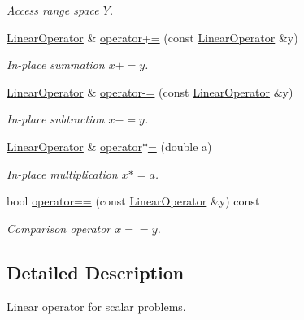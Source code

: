 \begin{DoxyCompactItemize}
\begin{DoxyCompactList}\small\item\em Access range space $Y$. \end{DoxyCompactList}\item 
\hyperlink{structSpacy_1_1Scalar_1_1LinearOperator}{Linear\-Operator} \& \hyperlink{classSpacy_1_1AddArithmeticOperators_afad1d01e1e8c6f75290ac46d9b047ea8}{operator+=} (const \hyperlink{structSpacy_1_1Scalar_1_1LinearOperator}{Linear\-Operator} \&y)
\begin{DoxyCompactList}\small\item\em In-\/place summation $ x+=y$. \end{DoxyCompactList}\item 
\hyperlink{structSpacy_1_1Scalar_1_1LinearOperator}{Linear\-Operator} \& \hyperlink{classSpacy_1_1AddArithmeticOperators_a9fa91e177d13203cfe8cfa991c64ca36}{operator-\/=} (const \hyperlink{structSpacy_1_1Scalar_1_1LinearOperator}{Linear\-Operator} \&y)
\begin{DoxyCompactList}\small\item\em In-\/place subtraction $ x-=y$. \end{DoxyCompactList}\item 
\hyperlink{structSpacy_1_1Scalar_1_1LinearOperator}{Linear\-Operator} \& \hyperlink{classSpacy_1_1AddArithmeticOperators_a1d3db95b24fd2bc1de712c9e04c47e2f}{operator$\ast$=} (double a)
\begin{DoxyCompactList}\small\item\em In-\/place multiplication $ x*=a$. \end{DoxyCompactList}\item 
bool \hyperlink{classSpacy_1_1AddArithmeticOperators_a5ff1909f49f4a705d69663dc2d4b6316}{operator==} (const \hyperlink{structSpacy_1_1Scalar_1_1LinearOperator}{Linear\-Operator} \&y) const
\begin{DoxyCompactList}\small\item\em Comparison operator $ x==y$. \end{DoxyCompactList}\end{DoxyCompactItemize}


\subsection{Detailed Description}
Linear operator for scalar problems. 

